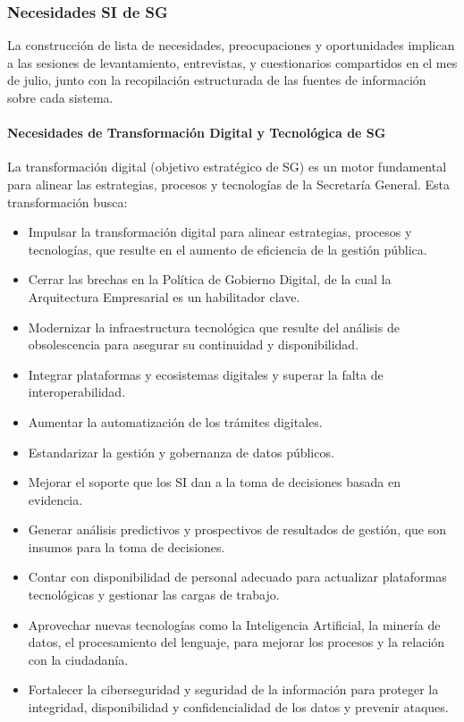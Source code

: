 \documentclass[
	a4paper, %
	12pt, %
]{include/CSSullivanBusinessReport}
\def\tightlist{}
\begin{document}
\subsubsection{Necesidades SI de SG}\label{sec:necesidades-si-de-sg}

La construcción de lista de necesidades, preocupaciones y oportunidades
implican a las sesiones de levantamiento, entrevistas, y cuestionarios
compartidos en el mes de julio, junto con la recopilación estructurada
de las fuentes de información sobre cada sistema.

\paragraph{Necesidades de Transformación Digital y Tecnológica de
SG}\label{sec:necesidades-de-transformaciuxf3n-digital-y-tecnoluxf3gica-de-sg}

La transformación digital (objetivo estratégico de SG) es un motor
fundamental para alinear las estrategias, procesos y tecnologías de la
Secretaría General. Esta transformación busca:

\begin{itemize}
\tightlist
\item
  Impulsar la transformación digital para alinear estrategias, procesos
  y tecnologías, que resulte en el aumento de eficiencia de la gestión
  pública.
\item
  Cerrar las brechas en la Política de Gobierno Digital, de la cual la
  Arquitectura Empresarial es un habilitador clave.
\item
  Modernizar la infraestructura tecnológica que resulte del análisis de
  obsolescencia para asegurar su continuidad y disponibilidad.
\item
  Integrar plataformas y ecosistemas digitales y superar la falta de
  interoperabilidad.
\item
  Aumentar la automatización de los trámites digitales.
\item
  Estandarizar la gestión y gobernanza de datos públicos.
\item
  Mejorar el soporte que los SI dan a la toma de decisiones basada en
  evidencia.
\item
  Generar análisis predictivos y prospectivos de resultados de gestión,
  que son insumos para la toma de decisiones.
\item
  Contar con disponibilidad de personal adecuado para actualizar
  plataformas tecnológicas y gestionar las cargas de trabajo.
\item
  Aprovechar nuevas tecnologías como la Inteligencia Artificial, la
  minería de datos, el procesamiento del lenguaje, para mejorar los
  procesos y la relación con la ciudadanía.
\item
  Fortalecer la ciberseguridad y seguridad de la información para
  proteger la integridad, disponibilidad y confidencialidad de los datos
  y prevenir ataques.
\end{itemize}
\end{document}
